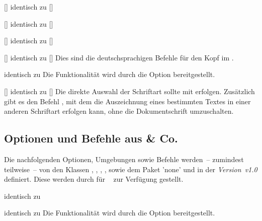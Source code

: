 \begin{Bundle*}{}
\begin{Declaration}{[]}{%
  identisch zu []%
}
\begin{Declaration}{[]}{%
  identisch zu []%
}
\begin{Declaration}{[]}{%
  identisch zu []%
}
\begin{Declaration}{[]}{%
  identisch zu []%
}
\printdeclarationlist%
%
Dies sind die deutschsprachigen Befehle für den Kopf im \CD.
\end{Declaration}
\end{Declaration}
\end{Declaration}
\end{Declaration}

\begin{Declaration}{}{%
  identisch zu %
}
\printdeclarationlist%
%
Die Funktionalität wird durch die Option  bereitgestellt.
\end{Declaration}

\begin{Declaration}{[]}{%
  identisch zu []%
}
\printdeclarationlist%
%
Die direkte Auswahl der Schriftart sollte mit  erfolgen. 
Zusätzlich gibt es den Befehl , mit dem die Auszeichnung 
eines bestimmten Textes in einer anderen Schriftart erfolgen kann, ohne die 
Dokumentschrift umzuschalten.
\end{Declaration}
%


\subsection{Optionen und Befehle aus  \& Co.}
%
Die nachfolgenden Optionen, Umgebungen sowie Befehle werden~-- zumindest 
teilweise~-- von den Klassen , , 
, ,  sowie dem Paket 
'none' und \TUDScript in der \emph{Version~v1.0} definiert. 
Diese werden durch  für \TUDScript~\vTUDScript{} zur 
Verfügung gestellt.

\begin{Declaration}{}{%
  identisch zu %
}
\begin{Declaration}{}{%
  identisch zu %
}
\printdeclarationlist%
%
Die Funktionalität wird durch die Option  bereitgestellt.
\end{Declaration}
\end{Declaration}


\end{Bundle*}
